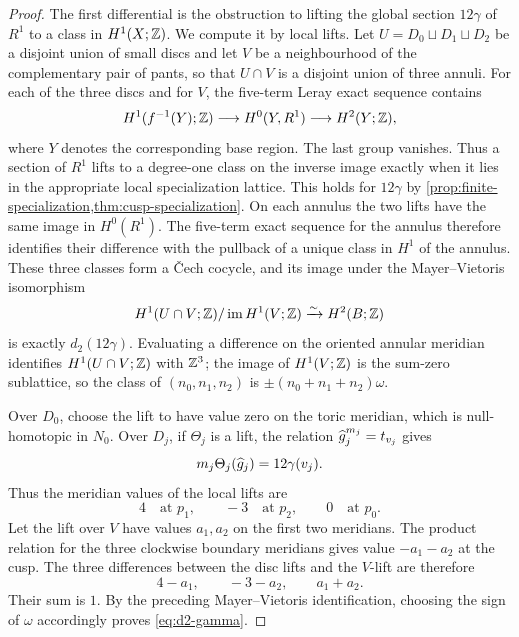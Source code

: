 \begin{proof}
The first differential is the obstruction to lifting the global section
$12\gamma$ of $R^1$ to a class in $H^1(X;\mathbb Z)$.  We compute it by local
lifts.  Let $U=D_0\sqcup D_1\sqcup D_2$ be a disjoint union of small
discs and let $V$ be a neighbourhood of the complementary pair of pants,
so that $U\cap V$ is a disjoint union of three annuli.  For each of the three discs and for $V$, the five-term Leray exact
sequence contains
\[
 H^1(f^{-1}(Y);\mathbb Z)\longrightarrow H^0(Y,R^1)
 \longrightarrow H^2(Y;\mathbb Z),
\]
where $Y$ denotes the corresponding base region.  The last group vanishes.
Thus a section of $R^1$ lifts to a degree-one class on the inverse image
exactly when it lies in the appropriate local specialization lattice.
This holds for $12\gamma$ by
\cref{prop:finite-specialization,thm:cusp-specialization}.
On each annulus the two lifts have the same image in $H^0(R^1)$.  The
five-term exact sequence for the annulus therefore identifies their
difference with the pullback of a unique class in $H^1$ of the annulus.
These three classes form a Čech cocycle, and its image under the
Mayer--Vietoris isomorphism
\[
 H^1(U\cap V;\mathbb Z)/\operatorname{im} H^1(V;\mathbb Z)
 \xrightarrow{\sim}H^2(B;\mathbb Z)
\]
is exactly $d_2(12\gamma)$.  Evaluating a difference on the oriented
annular meridian identifies $H^1(U\cap V;\mathbb Z)$ with $\mathbb Z^3$; the image of
$H^1(V;\mathbb Z)$ is the sum-zero sublattice, so the class of
$(n_0,n_1,n_2)$ is $\pm(n_0+n_1+n_2)\omega$.

Over $D_0$, choose the lift to have value zero on the toric meridian,
which is null-homotopic in $N_0$.  Over $D_j$, if $\Theta_j$ is a lift,
the relation $\widehat g_j^{m_j}=t_{v_j}$ gives
\[
 m_j\Theta_j(\widehat g_j)=12\gamma(v_j).
\]
Thus the meridian values of the local lifts are
\[
 4\quad\text{at }p_1,
 \qquad
 -3\quad\text{at }p_2,
 \qquad
 0\quad\text{at }p_0.
\]
Let the lift over $V$ have values $a_1,a_2$ on the first two meridians.
The product relation for the three clockwise boundary meridians gives
value $-a_1-a_2$ at the cusp.  The three differences between the disc
lifts and the $V$-lift are therefore
\[
 4-a_1,
 \qquad
 -3-a_2,
 \qquad
 a_1+a_2.
\]
Their sum is $1$.  By the preceding Mayer--Vietoris identification,
choosing the sign of $\omega$ accordingly proves \eqref{eq:d2-gamma}.


\end{proof}
